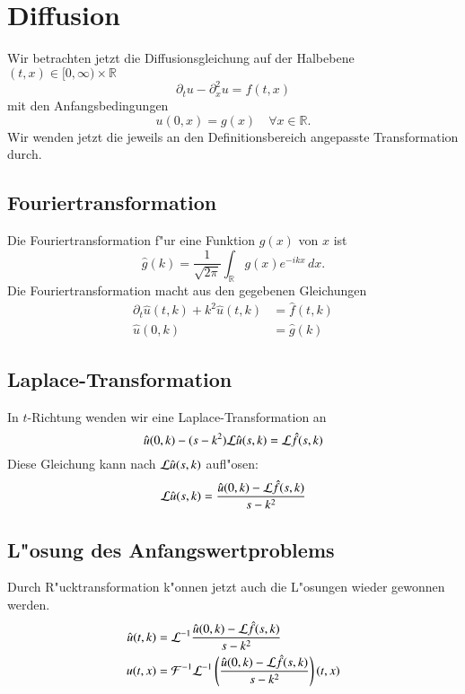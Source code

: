 \section{Diffusion}
Wir betrachten jetzt die Diffusionsgleichung auf der Halbebene
$(t,x)\in[0,\infty)\times \mathbb R$
\[
\partial_tu-\partial_x^2u=f(t,x)
\]
mit den Anfangsbedingungen
\[
u(0,x)=g(x)\quad \forall x\in\mathbb R.
\]
Wir wenden jetzt die jeweils an den Definitionsbereich angepasste
Transformation durch.
\subsection{Fouriertransformation}
Die Fouriertransformation f"ur eine Funktion $g(x)$ von $x$ ist
\[
\hat g(k)=\frac1{\sqrt{2\pi}}\int_{\mathbb R}g(x)e^{-ikx}\,dx.
\]
Die Fouriertransformation macht aus den gegebenen Gleichungen
\begin{align*}
\partial_t \hat u(t,k)+k^2\hat u(t,k)&=\hat f(t,k)\\
\hat u(0,k)&=\hat g(k)
\end{align*}
\subsection{Laplace-Transformation}
In $t$-Richtung wenden wir eine Laplace-Transformation an
\[
\hat u(0,k)-(s-k^2){\cal L}\hat u(s,k)={\cal L}\hat f(s,k)
\]
Diese Gleichung kann nach ${\cal L}\hat u(s,k)$ aufl"osen:
\[
{\cal L}\hat u(s,k)=\frac{\hat u(0,k)-{\cal L}\hat f(s,k)}{s-k^2}
\]
\subsection{L"osung des Anfangswertproblems}
Durch R"ucktransformation k"onnen jetzt auch die L"osungen wieder
gewonnen werden.
\begin{align*}
\hat u(t,k)&={\cal L}^{-1}
\frac{\hat u(0,k)-{\cal L}\hat f(s,k)}{s-k^2}
\\
u(t,x)&={\cal F}^{-1}{\cal L}^{-1}
\left(\frac{\hat u(0,k)-{\cal L}\hat f(s,k)}{s-k^2}\right)(t,x)
\end{align*}

